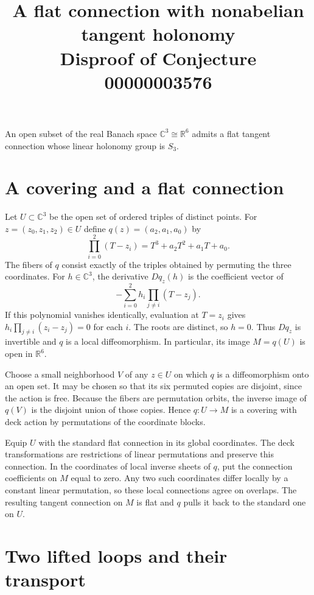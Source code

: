 \documentclass[11pt]{article}
\title{A flat connection with nonabelian tangent holonomy\\[2pt]
  \large Disproof of Conjecture 00000003576}
\author{}
\date{}
\begin{document}
\maketitle

\noindent
An open subset of the real Banach space $\mathbb C^3\cong\mathbb R^6$
admits a flat tangent connection whose linear holonomy group is $S_3$.

\section*{A covering and a flat connection}

Let $U\subset\mathbb C^3$ be the open set of ordered triples of distinct
points. For $z=(z_0,z_1,z_2)\in U$ define $q(z)=(a_2,a_1,a_0)$ by
\[
  \prod_{i=0}^2 (T-z_i)=T^3+a_2T^2+a_1T+a_0.
\]
The fibers of $q$ consist exactly of the triples obtained by permuting
the three coordinates. For $h\in\mathbb C^3$, the derivative $Dq_z(h)$
is the coefficient vector of
\[
 -\sum_{i=0}^2 h_i\prod_{j\ne i}(T-z_j).
\]
If this polynomial vanishes identically, evaluation at $T=z_i$ gives
$h_i\prod_{j\ne i}(z_i-z_j)=0$ for each $i$. The roots are distinct, so
$h=0$. Thus $Dq_z$ is invertible and $q$ is a local diffeomorphism. In
particular, its image $M=q(U)$ is open in $\mathbb R^6$.

Choose a small neighborhood $V$ of any $z\in U$ on which $q$ is a
diffeomorphism onto an open set. It may be chosen so that its six
permuted copies are disjoint, since the action is free. Because the
fibers are permutation orbits, the inverse image of $q(V)$ is the
disjoint union of those copies. Hence $q\colon U\to M$ is a covering
with deck action by permutations of the coordinate blocks.

Equip $U$ with the standard flat connection in its global coordinates.
The deck transformations are restrictions of linear permutations and
preserve this connection. In the coordinates of local inverse sheets
of $q$, put the connection coefficients on $M$ equal to zero. Any two
such coordinates differ locally by a constant linear permutation, so
these local connections agree on overlaps. The resulting tangent
connection on $M$ is flat and $q$ pulls it back to the standard one
on $U$.

\section*{Two lifted loops and their transport}
\end{document}
